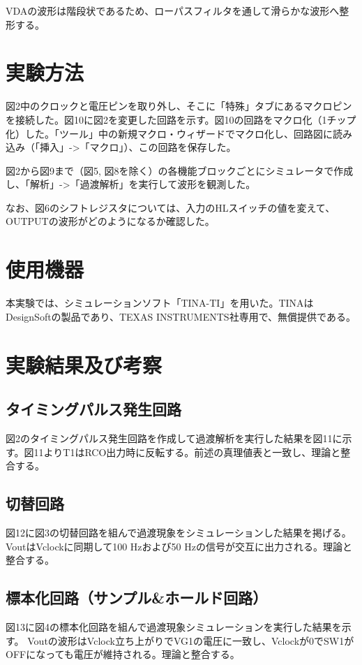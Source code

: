 \documentclass[
  a4paper,
  11pt,
]{ltjsarticle}
\begin{document}
VDAの波形は階段状であるため、ローパスフィルタを通して滑らかな波形へ整形する。

\section{実験方法}
図2中のクロックと電圧ピンを取り外し、そこに「特殊」タブにあるマクロピンを接続した。図10に図2を変更した回路を示す。図10の回路をマクロ化（1チップ化）した。「ツール」中の新規マクロ・ウィザードでマクロ化し、回路図に読み込み（「挿入」->「マクロ」）、この回路を保存した。

図2から図9まで（図5, 図8を除く）の各機能ブロックごとにシミュレータで作成し、「解析」->「過渡解析」を実行して波形を観測した。

なお、図6のシフトレジスタについては、入力のHLスイッチの値を変えて、OUTPUTの波形がどのようになるか確認した。

\section{使用機器}
本実験では、シミュレーションソフト「TINA-TI」を用いた。TINAはDesignSoftの製品であり、TEXAS INSTRUMENTS社専用で、無償提供である。

\section{実験結果及び考察}

\subsection{タイミングパルス発生回路}
図2のタイミングパルス発生回路を作成して過渡解析を実行した結果を図11に示す。図11よりT1はRCO出力時に反転する。前述の真理値表と一致し、理論と整合する。

\subsection{切替回路}
図12に図3の切替回路を組んで過渡現象をシミュレーションした結果を掲げる。
VoutはVclockに同期して100 \si{\hertz}および50 \si{\hertz}の信号が交互に出力される。理論と整合する。

\subsection{標本化回路（サンプル\&ホールド回路）}
図13に図4の標本化回路を組んで過渡現象シミュレーションを実行した結果を示す。
Voutの波形はVclock立ち上がりでVG1の電圧に一致し、Vclockが0でSW1がOFFになっても電圧が維持される。理論と整合する。
\end{document}
